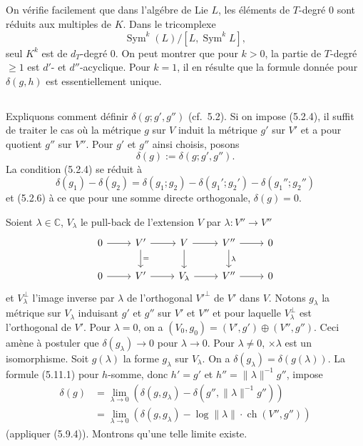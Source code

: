 \documentclass[12pt,a4paper]{article}
\theoremstyle{plain}
\theoremstyle{definition}
\DeclareMathOperator{\ch}{ch}
\DeclareMathOperator{\Sym}{Sym}
\newcommand{\CC}{\mathbb{C}}
\begin{document}
\subsection{}

On v\'erifie facilement que dans l'alg\'ebre de Lie $L$, les \'el\'ements
de $T$-degr\'e $0$ sont r\'eduits aux multiples de $K$. Dans le tricomplexe
\[
\Sym^k(L)/[L, \Sym^k L] ,
\]
seul $K^k$ est de $d_T$-degr\'e $0$. On peut montrer que pour $k > 0$, la partie
de $T$-degr\'e $\geq 1$ est $d'$- et $d''$-acyclique. Pour $k = 1$, il en r\'esulte que la
formule donn\'ee pour $\delta(g, h)$ est essentiellement unique.

\subsection{}

Expliquons comment d\'efinir $\delta(g; g', g'')$ (cf.~5.2). Si on impose (5.2.4),
il suffit de traiter le cas o\`u la m\'etrique $g$ sur $V$ induit la m\'etrique $g'$
sur $V'$ et a pour quotient $g''$ sur $V''$. Pour $g'$ et $g''$ ainsi choisis, posons
\[
\delta(g) := \delta(g; g', g'') .
\]
La condition (5.2.4) se r\'eduit \`a
\[
\delta(g_1) - \delta(g_2) = \delta(g_1; g_2) - \delta(g_1'; g_2') - \delta(g_1''; g_2'')
\]
et (5.2.6) \`a ce que pour une somme directe orthogonale, $\delta(g) = 0$.

Soient $\lambda \in \CC$, $V_\lambda$ le pull-back de l'extension $V$ par $\lambda: V'' \to V''$
\[
\begin{tikzcd}
0 \arrow[r] & V' \arrow[r] \arrow[d, "="] & V \arrow[r] \arrow[d] & V'' \arrow[r] \arrow[d, "\lambda"] & 0 \\
0 \arrow[r] & V' \arrow[r] & V_\lambda \arrow[r] & V'' \arrow[r] & 0
\end{tikzcd}
\]
et $V_\lambda^\perp$ l'image inverse par $\lambda$ de l'orthogonal $V'^\perp$ de $V'$ dans $V$. Notons $g_\lambda$
la m\'etrique sur $V_\lambda$ induisant $g'$ et $g''$ sur $V'$ et $V''$ et pour laquelle $V_\lambda^\perp$ est
l'orthogonal de $V'$. Pour $\lambda = 0$, on a $(V_0, g_0) = (V', g') \oplus (V'', g'')$. Ceci am\`ene
\`a postuler que $\delta(g_\lambda) \to 0$ pour $\lambda \to 0$. Pour $\lambda \neq 0$, $\times \lambda$ est un isomorphisme.
Soit $g(\lambda)$ la forme $g_\lambda$ sur $V_\lambda$. On a $\delta(g_\lambda) = \delta(g(\lambda))$. La formule (5.11.1)
pour $h$-somme, donc $h' = g'$ et $h'' = \|\lambda\|^{-1} g''$, impose
\[
\begin{aligned}
\delta(g) &= \lim_{\lambda \to 0} (\delta(g, g_\lambda) - \delta(g'', \|\lambda\|^{-1} g'')) \\
&= \lim_{\lambda \to 0} (\delta(g, g_\lambda) - \log\|\lambda\| \cdot \ch(V'', g''))
\end{aligned}
\]
(appliquer (5.9.4)). Montrons qu'une telle limite existe.
\end{document}
